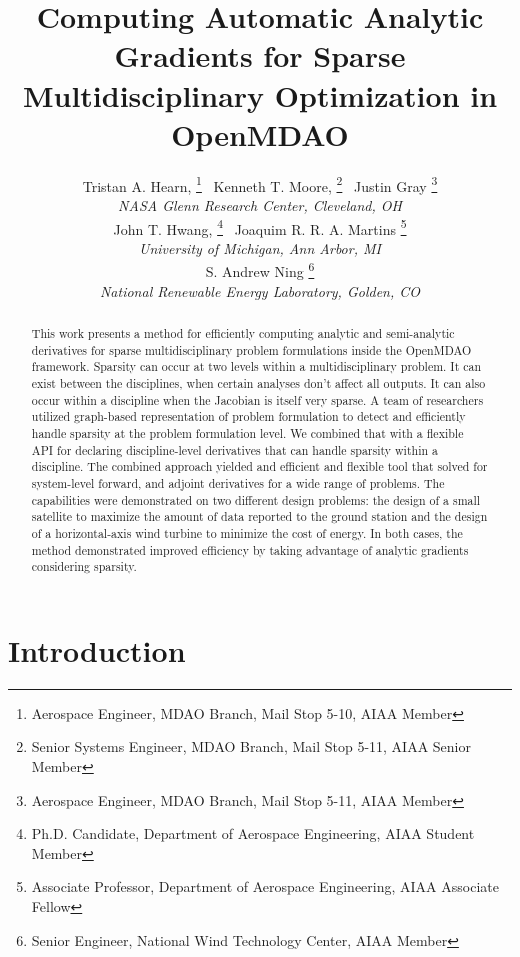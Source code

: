 \documentclass[]{aiaa-tc} %
\title{Computing Automatic Analytic Gradients for Sparse Multidisciplinary Optimization in OpenMDAO}
\author{
  Tristan A. Hearn,%
     \thanks{Aerospace Engineer, MDAO Branch, Mail Stop 5-10, AIAA Member}
  \ Kenneth T. Moore,%
     \thanks{Senior Systems Engineer, MDAO Branch, Mail Stop 5-11, AIAA Senior Member}
  \ Justin Gray%
     \thanks{Aerospace Engineer, MDAO Branch, Mail Stop 5-11, AIAA Member}
   \\
  {\normalsize\itshape
  NASA Glenn Research Center, Cleveland, OH}  \\
  John T. Hwang,%
  \thanks{Ph.D. Candidate, Department of Aerospace Engineering, AIAA Student Member}
  \ Joaquim R. R. A. Martins%
  \thanks{Associate Professor, Department of Aerospace Engineering, AIAA Associate Fellow}
  \\
  {\normalsize\itshape
   University of Michigan, Ann Arbor, MI}\\
  S. Andrew Ning
    \thanks{Senior Engineer, National Wind Technology Center, AIAA Member}
  \\
  {\normalsize\itshape
   National Renewable Energy Laboratory, Golden, CO}
}
\begin{document}
  \maketitle

  \begin{abstract}

  This work presents a method for efficiently computing analytic and semi-analytic derivatives for sparse multidisciplinary 
  problem formulations inside the OpenMDAO framework. Sparsity can occur at two levels within a multidisciplinary problem. 
  It can exist between the disciplines, when certain analyses don't affect all outputs. It can also occur within a discipline when
  the Jacobian is itself very sparse. A team of researchers utilized graph-based representation of problem formulation to detect and efficiently 
  handle sparsity at the problem formulation level. We combined that with a flexible API for declaring discipline-level derivatives 
  that can handle sparsity within a discipline. The combined approach yielded and efficient and flexible tool that solved
  for system-level forward, and adjoint derivatives for a wide range of problems. The capabilities 
  were demonstrated on two different design problems: the design of a small satellite to maximize the amount of data reported 
  to the ground station and the design of a horizontal-axis wind turbine to minimize the cost of energy. In both cases, the 
  method demonstrated improved efficiency by taking advantage of analytic gradients considering sparsity.

  \end{abstract}

  \section{Introduction}
\end{document}
